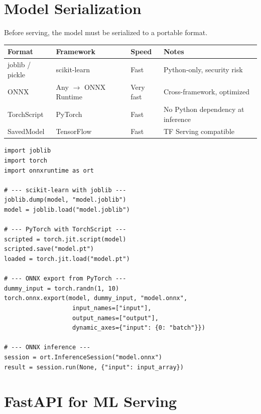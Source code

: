 \section{Model Serialization}
\label{sec:serialization}

Before serving, the model must be serialized to a portable format.

\begin{center}
\begin{tabular}{@{}lllp{4cm}@{}}
\toprule
\textbf{Format} & \textbf{Framework} & \textbf{Speed} &
  \textbf{Notes} \\
\midrule
joblib / pickle & scikit-learn & Fast & Python-only, security risk \\
ONNX & Any $\to$ ONNX Runtime & Very fast & Cross-framework,
  optimized \\
TorchScript & PyTorch & Fast & No Python dependency at inference \\
SavedModel & TensorFlow & Fast & TF Serving compatible \\
\bottomrule
\end{tabular}
\end{center}

\begin{codeblock}[title=\textbf{Model serialization examples}]
\begin{verbatim}
import joblib
import torch
import onnxruntime as ort

# --- scikit-learn with joblib ---
joblib.dump(model, "model.joblib")
model = joblib.load("model.joblib")

# --- PyTorch with TorchScript ---
scripted = torch.jit.script(model)
scripted.save("model.pt")
loaded = torch.jit.load("model.pt")

# --- ONNX export from PyTorch ---
dummy_input = torch.randn(1, 10)
torch.onnx.export(model, dummy_input, "model.onnx",
                   input_names=["input"],
                   output_names=["output"],
                   dynamic_axes={"input": {0: "batch"}})

# --- ONNX inference ---
session = ort.InferenceSession("model.onnx")
result = session.run(None, {"input": input_array})
\end{verbatim}
\end{codeblock}

\section{FastAPI for ML Serving}
\label{sec:fastapi}

